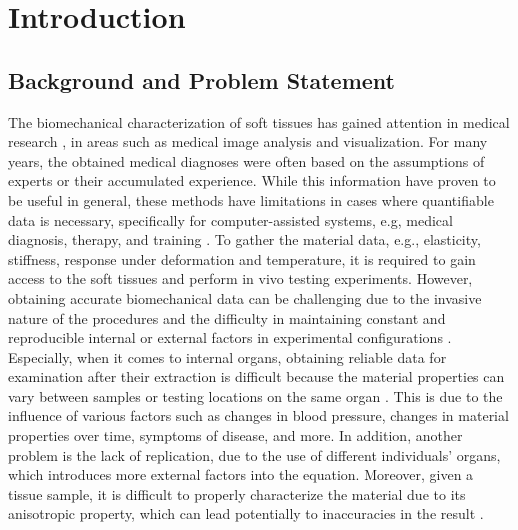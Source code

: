 
\chapter{Introduction} %

\label{Chapter2} %

\section{Background and Problem Statement}
The biomechanical characterization of soft tissues has gained attention
in medical research \cite{Cox2006}, in areas such as medical image analysis and visualization.
For many years, the obtained medical diagnoses were often based on the assumptions of experts or 
their accumulated experience. While this information have proven to be useful in general, 
these methods have limitations in cases where quantifiable data is necessary, specifically for computer-assisted systems, e.g,
medical diagnosis, therapy, and training \cite{Kauer2002}.
To gather the material data, e.g., elasticity, stiffness, response under deformation and temperature, it is required 
to gain access to the soft tissues and perform in vivo testing experiments. 
However, obtaining accurate biomechanical data can be challenging 
due to the invasive nature of the procedures and the difficulty in maintaining constant and reproducible internal or external factors  
in experimental configurations \cite{Carter2001}.\\

Especially, when it comes to internal organs, obtaining reliable data for examination after their 
extraction is difficult because the material properties can vary between samples or testing 
locations on the same organ \cite{Chai2013}. This is due to the influence of various factors such as changes in blood pressure, changes in material properties 
over time, symptoms of disease, and more. In addition, another problem is the lack 
of replication, due to the use of different individuals' organs, which introduces more external
factors into the equation. Moreover, given a tissue sample, it is difficult to properly 
characterize the material due to its anisotropic property, which can lead potentially
 to inaccuracies in the result \cite{Cox2006}.

